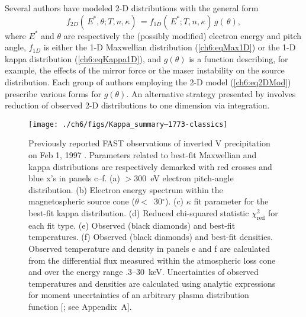   Several authors \citep{Maggs1981,Bingham1999,Bingham2000,Mutel2007} have
  modeled 2-D distributions with the general form
    \begin{equation} \label{ch6:eq2DMod} f_{2D}(\, E^*, \theta ; T, n,
      \kappa) \, = f_{1D}(\, E^*; T, n, \kappa) \, g(\, \theta),
    \end{equation}
    where $E^*$ and $\theta$ are respectively the (possibly modified)
    electron energy and pitch angle, $f_{1D}$ is either the 1-D
    Maxwellian distribution (\ref{ch6:eqMax1D}) or the 1-D kappa
    distribution (\ref{ch6:eqKappa1D}), and $g(\theta )$ is a function
    describing, for example, the effects of the mirror force or the
    maser instability on the source distribution. Each group of
    authors employing the 2-D model (\ref{ch6:eq2DMod}) prescribe
    various forms for $g(\theta)$.  An alternative strategy presented
    by \citet{Pritchett1999} involves reduction of observed 2-D
    distributions to one dimension via integration.


  \begin{figure}
    \centering
    \noindent\texttt{[image: ./ch6/figs/Kappa\_summary--1773-classics]}
    \caption[Orbit 1773: Observed inverted-V precipitation, and
    best-fit Maxwellian and kappa distribution parameters]{Previously
      reported FAST observations of inverted V precipitation on Feb 1,
      1997 \citep{Elphic1998}. Parameters related to best-fit
      Maxwellian and kappa distributions are respectively demarked
      with red crosses and blue x's in panels c--f. (a) $>$300~eV
      electron pitch-angle distribution. (b) Electron energy spectrum
      within the magnetospheric source cone
      ($\theta$$<$~30$^\circ$). (c) $\kappa$ fit parameter for the
      best-fit kappa distribution. (d) Reduced chi-squared statistic
      $\chi^2_{\mathrm{red}}$ for each fit type. (e) Observed (black
      diamonds) and best-fit temperatures. (f) Observed (black
      diamonds) and best-fit densities. Observed temperature and
      density in panels e and f are calculated from the differential
      flux measured within the atmospheric loss cone and over the
      energy range .3--30~keV. Uncertainties of observed temperatures
      and densities are calculated using analytic expressions for
      moment uncertainties of an arbitrary plasma distribution
      function [\citealt{Gershman2015}; see Appendix~A].}
    \label{ch6:Fig1}
  \end{figure}


